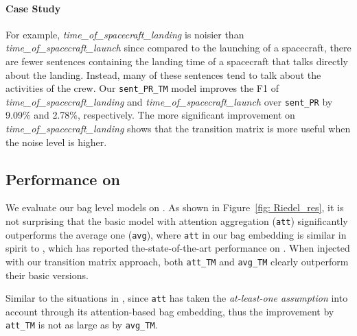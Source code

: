\paragraph{Case Study}
 For example, \textit{time\_of\_spacecraft\_landing} is noisier than \textit{time\_of\_spacecraft\_launch} since compared to the launching of a spacecraft, there are fewer sentences containing the landing time of a spacecraft that talks directly about the landing. Instead, many of these sentences tend to talk about the activities of the crew. Our \texttt{sent\_PR\_TM} model improves the F1 of \textit{time\_of\_spacecraft\_landing} and \textit{time\_of\_spacecraft\_launch} over \texttt{sent\_PR} by 9.09\% and 2.78\%, respectively. The more significant improvement on \textit{time\_of\_spacecraft\_landing} shows that the transition matrix is more useful when the noise level is higher. 


\subsection{Performance on \EntityRE}
We evaluate our bag level models on \EntityRE. 
As shown in Figure~\ref{fig: Riedel_res}, it is not surprising that the basic model with attention aggregation (\texttt{att}) significantly outperforms the average one (\texttt{avg}), where \texttt{att}  in our bag embedding is similar in spirit to \cite{lin2016neural},
which has reported the-state-of-the-art performance on \EntityRE.  
When injected with our transition matrix approach,  both \texttt{att\_TM} and \texttt{avg\_TM} clearly outperform their basic versions.

Similar to the situations in \TimeRE, since  \texttt{att} has taken the \textit{at-least-one assumption} into account  through its attention-based bag embedding, thus the improvement by \texttt{att\_TM}  is not as large as by \texttt{avg\_TM}.

